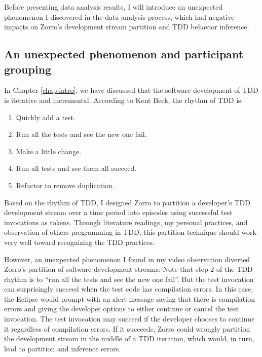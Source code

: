 Before presenting data analysis results, I will introduce an unexpected
phenomenon I discovered in the data analysis process, which had
negative impacts on Zorro's development stream partition and TDD
behavior inference. 

\subsection{An unexpected phenomenon and participant grouping}
\label{subsec:ParticipantGroup}

In Chapter \ref{chap:intro}, we have discussed that the software 
development of TDD is iterative and incremental. According to Kent 
Beck\cite{Beck:03}, the rhythm of TDD is:
\begin{enumerate}
\item Quickly add a test.
\item Run all the tests and see the new one fail.
\item Make a little change.
\item Run all tests and see them all succeed.
\item Refactor to remove duplication.
\end{enumerate}

Based on the rhythm of TDD, I designed Zorro to partition a developer's
TDD development stream over a time period into episodes using successful
test invocations as tokens. Through literature readings, my personal 
practices, and observation of others programming in TDD, this partition
technique should work very well toward recognizing the TDD practices.

However, an unexpected phenomenon I found in my video observation 
diverted Zorro's partition of software development streams. 
Note that step 2 of the TDD rhythm is to ``run all the tests and see 
the new one fail''. But the test invocation can surprisingly succeed 
when the test code has compilation errors. In this case, the Eclipse
would prompt with an alert message saying that there is compilation 
errors and giving the developer options to either continue or cancel 
the test invocation. The test invocation may succeed if the developer 
chooses to continue it regardless of compilation errors. If it succeeds, 
Zorro could wrongly partition the development stream in the middle of 
a TDD iteration, which would, in turn, lead to partition and inference 
errors.


